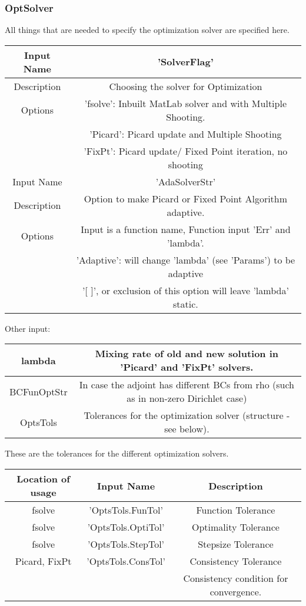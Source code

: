 \documentclass[11pt, a4paper]{article}
\theoremstyle{definition}
\begin{document}
\subsubsection{OptSolver}
All things that are needed to specify the optimization solver are specified here. 
\begin{center}
	\begin{tabular}{ | c | c |}
		\hline
		Input Name & 'SolverFlag' \\ 
		\hline
		Description & Choosing the solver for Optimization\\ 
		\hline 
		Options & 'fsolve': Inbuilt MatLab solver and with Multiple Shooting. \\
		& 'Picard': Picard update and Multiple Shooting \\
		& 'FixPt': Picard update/ Fixed Point iteration, no shooting \\
		\hline
		\hline
		Input Name & 'AdaSolverStr' \\ 
		\hline
		Description & Option to make Picard or Fixed Point Algorithm adaptive.\\ 
		\hline 
		Options & Input is a function name, Function input 'Err' and 'lambda'.\\
		& 'Adaptive': will change 'lambda' (see 'Params') to be adaptive\\
		& '[  ]', or exclusion of this option will leave 'lambda' static. \\
		\hline
     \end{tabular}
	\end{center}
Other input:
\begin{center}
	\begin{tabular}{ | c | c |}
		\hline
		lambda & Mixing rate of old and new solution in 'Picard' and 'FixPt' solvers.\\
		\hline
		BCFunOptStr & In case the adjoint has different BCs  from rho (such as in non-zero Dirichlet case)\\
		\hline
		OptsTols & Tolerances for the optimization solver (structure - see below).\\
		\hline
	\end{tabular}
\end{center}
These are the tolerances for the different optimization solvers.
\begin{center}
	\begin{tabular}{ | c | c | c |}
		\hline
		Location of usage & Input Name  & Description  \\ 
		\hline
		fsolve & 'OptsTols.FunTol' & Function Tolerance  \\
		fsolve & 'OptsTols.OptiTol' & Optimality Tolerance  \\ 
		fsolve & 'OptsTols.StepTol' & Stepsize Tolerance  \\ 
		\hline 
		Picard, FixPt & 'OptsTols.ConsTol' & Consistency Tolerance  \\ 
		& & Consistency condition for convergence.\\
		\hline
	\end{tabular}
\end{center}
\end{document}
